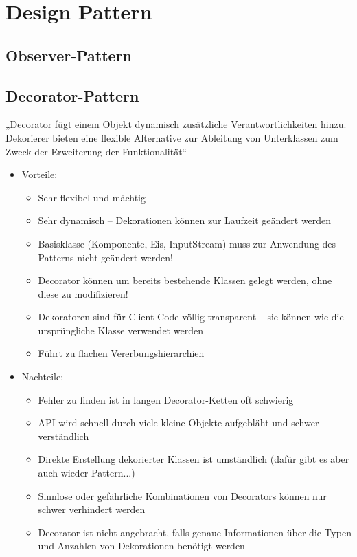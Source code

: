  \section{Design Pattern}
\subsection{Observer-Pattern}

\subsection{Decorator-Pattern}
„Decorator fügt einem Objekt dynamisch zusätzliche Verantwortlichkeiten hinzu. Dekorierer bieten eine flexible Alternative zur Ableitung von Unterklassen zum Zweck der Erweiterung der Funktionalität“

\begin{itemize}
	\item Vorteile:
	\begin{itemize}
\item Sehr flexibel und mächtig
\item Sehr dynamisch – Dekorationen können zur Laufzeit geändert werden
\item Basisklasse (Komponente, Eis, InputStream) muss zur Anwendung des Patterns nicht geändert werden!
\item Decorator können um bereits bestehende Klassen gelegt werden, ohne diese zu modifizieren!
\item Dekoratoren sind für Client-Code völlig transparent – sie können wie die ursprüngliche Klasse verwendet werden
\item Führt zu flachen Vererbungshierarchien
	\end{itemize}
	\item Nachteile:
	\begin{itemize}
\item Fehler zu finden ist in langen Decorator-Ketten oft schwierig
\item API wird schnell durch viele kleine Objekte aufgebläht und schwer verständlich
\item Direkte Erstellung dekorierter Klassen ist umständlich (dafür gibt es aber auch wieder Pattern...)
\item  Sinnlose oder gefährliche Kombinationen von Decorators können nur schwer verhindert werden
\item Decorator ist nicht angebracht, falls genaue Informationen über die Typen und Anzahlen von Dekorationen benötigt werden
	\end{itemize}
\end{itemize}
%
%
%

